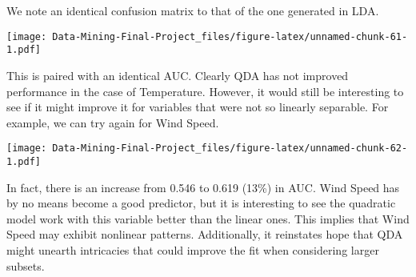 \documentclass[
]{article}
\newenvironment{Shaded}{\begin{snugshade}}{\end{snugshade}}
\newcommand{\AttributeTok}[1]{\textcolor[rgb]{0.13,0.29,0.53}{#1}}
\newcommand{\ConstantTok}[1]{\textcolor[rgb]{0.56,0.35,0.01}{#1}}
\newcommand{\DecValTok}[1]{\textcolor[rgb]{0.00,0.00,0.81}{#1}}
\newcommand{\FunctionTok}[1]{\textcolor[rgb]{0.13,0.29,0.53}{\textbf{#1}}}
\newcommand{\NormalTok}[1]{#1}
\newcommand{\OtherTok}[1]{\textcolor[rgb]{0.56,0.35,0.01}{#1}}
\newcommand{\SpecialCharTok}[1]{\textcolor[rgb]{0.81,0.36,0.00}{\textbf{#1}}}
\newcommand{\StringTok}[1]{\textcolor[rgb]{0.31,0.60,0.02}{#1}}
\begin{document}
We note an identical confusion matrix to that of the one generated in
LDA.

\begin{Shaded}
\end{Shaded}

\texttt{[image: Data-Mining-Final-Project\_files/figure-latex/unnamed-chunk-61-1.pdf]}

This is paired with an identical AUC. Clearly QDA has not improved
performance in the case of Temperature. However, it would still be
interesting to see if it might improve it for variables that were not so
linearly separable. For example, we can try again for Wind Speed.

\begin{Shaded}
\end{Shaded}

\texttt{[image: Data-Mining-Final-Project\_files/figure-latex/unnamed-chunk-62-1.pdf]}

In fact, there is an increase from 0.546 to 0.619 (13\%) in AUC. Wind
Speed has by no means become a good predictor, but it is interesting to
see the quadratic model work with this variable better than the linear
ones. This implies that Wind Speed may exhibit nonlinear patterns.
Additionally, it reinstates hope that QDA might unearth intricacies that
could improve the fit when considering larger subsets.
\end{document}
